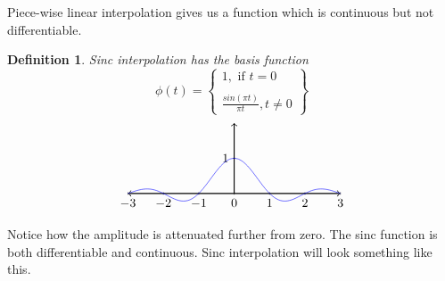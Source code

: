 \documentclass{article}
\newtheorem{definition}{Definition}
\begin{document}
Piece-wise linear interpolation gives us a function which is continuous but not differentiable.
\begin{definition}
    Sinc interpolation has the basis function
    \[
        \phi(t) = \left\{
            \begin{array}{c}
                1, \text{ if } t = 0\\\\
                \frac{sin(\pi t)}{\pi t}, t \ne 0
            \end{array}
            \right\}
    \]
    \[
        \begin{tikzpicture}
            \draw[thick,<->] (-3, 0) -- (3,0);
            \draw[thick,->] (0,0) -- (0,2);
            \foreach \x in {-3, -2, -1, 0, 1, 2, 3}
                \draw (\x ,1pt) -- (\x ,-1pt) node[anchor=north] {$\x$};
            \foreach \y in {1}
                \draw (1pt,\y cm) -- (-1pt,\y cm) node[anchor=east] {$\y$};
                \draw[scale=1,domain=-3:-0.001,smooth,variable=\x,blue] plot (\x,{sin((\x r * pi))/(\x * pi)});
                \draw[scale=1,domain=0.001:3,smooth,variable=\x,blue] plot (\x,{sin((\x r * pi))/(\x * pi)});
        \end{tikzpicture}
    \]
\end{definition}
Notice how the amplitude is attenuated further from zero. The sinc function is both differentiable and continuous.
Sinc interpolation will look something like this.
\end{document}
